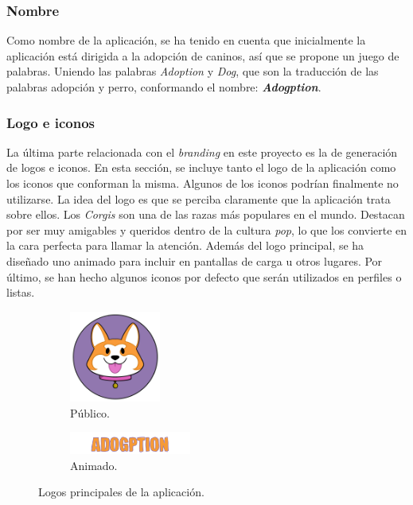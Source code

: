 \documentclass[a4paper, 12pt]{article}
\begin{document}
\subsubsection{Nombre}

Como nombre de la aplicación,  se ha tenido en cuenta que inicialmente la aplicación está dirigida a la adopción de caninos, así que se propone un juego de palabras. Uniendo las palabras \textit{Adoption} y \textit{Dog}, que son la traducción de las palabras adopción y perro, conformando el nombre: \textbf{\textit{Adogption}}.

\subsubsection{Logo e iconos}

La última parte relacionada con el \textit{branding} en este proyecto es la de generación de logos e iconos. En esta sección, se incluye tanto el logo de la aplicación como los iconos que conforman la misma. Algunos de los iconos podrían finalmente no utilizarse. La idea del logo es que se perciba claramente que la aplicación trata sobre ellos. Los \textit{Corgis} son una de las razas más populares en el mundo. Destacan por ser muy amigables y queridos dentro de la cultura \textit{pop}, lo que los convierte en la cara perfecta para llamar la atención. Además del logo principal, se ha diseñado uno animado para incluir en pantallas de carga u otros lugares. Por último, se han hecho algunos iconos por defecto que serán utilizados en perfiles o listas.


\begin{figure}[H]
   	\begin{subfigure}{0.48\textwidth}
		\begin{center}
			{\includegraphics[width=3cm]{logo/Logo1.png}\par}
			\caption{Público.}
		\end{center}  
	\end{subfigure}\hfill
   	\begin{subfigure}{0.48\textwidth}
		\begin{center}
			{\includegraphics[width=4cm]{logo/ADOGPTIONFIXED.png}\par}
			\caption{Animado.}
		\end{center}  
	\end{subfigure}\hfill
	\caption{Logos principales de la aplicación.}
\end{figure}
\end{document}
